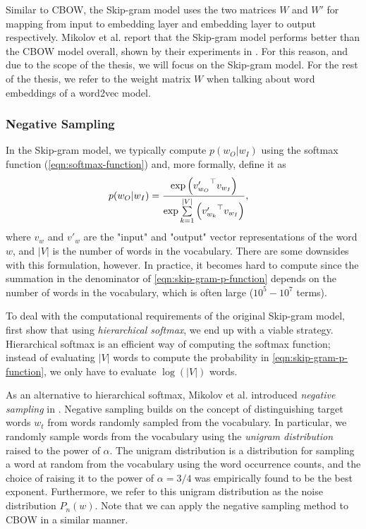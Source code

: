 Similar to CBOW, the Skip-gram model uses the two matrices $W$ and $W'$ for mapping from input to embedding layer and embedding layer to output respectively. Mikolov et al. report that the Skip-gram model performs better than the CBOW model overall, shown by their experiments in \cites{mikolov2013a}. For this reason, and due to the scope of the thesis, we will focus on the Skip-gram model. For the rest of the thesis, we refer to the weight matrix $W$ when talking about word embeddings of a word2vec model.

\subsubsection{Negative Sampling}
In the Skip-gram model, we typically compute $p(w_O | w_I)$ using the softmax function (\cref{eqn:softmax-function}) and, more formally, define it as
\begin{align}
    p(w_O | w_I)
    &= \frac{\exp{ \left( {v'_{w_O}}^\top v_{w_I} \right) }} {\exp{ \sum\limits_{k=1}^{|V|} \left( {v'_{w_k}}^\top v_{w_I} \right) }},
    \label{eqn:skip-gram-p-function}
\end{align}
where $v_w$ and $v'_w$ are the "input" and "output" vector representations of the word $w$, and $|V|$ is the number of words in the vocabulary. There are some downsides with this formulation, however. In practice, it becomes hard to compute since the summation in the denominator of \cref{eqn:skip-gram-p-function} depends on the number of words in the vocabulary, which is often large ($10^5 - 10^7$ terms).

To deal with the computational requirements of the original Skip-gram model, \cite{mikolov2013b} first show that using \textit{hierarchical softmax}, we end up with a viable strategy. Hierarchical softmax is an efficient way of computing the softmax function; instead of evaluating $|V|$ words to compute the probability in \cref{eqn:skip-gram-p-function}, we only have to evaluate $\log \left( |V| \right)$ words.

As an alternative to hierarchical softmax, Mikolov et al. introduced \textit{negative sampling} in \cite{mikolov2013b}. Negative sampling builds on the concept of distinguishing target words $w_t$ from words randomly sampled from the vocabulary. In particular, we randomly sample words from the vocabulary using the \textit{unigram distribution} raised to the power of $\alpha$. The unigram distribution is a distribution for sampling a word at random from the vocabulary using the word occurrence counts, and the choice of raising it to the power of $\alpha = 3/4$ was empirically found to be the best exponent. Furthermore, we refer to this unigram distribution as the noise distribution $P_n(w)$. Note that we can apply the negative sampling method to CBOW in a similar manner.

